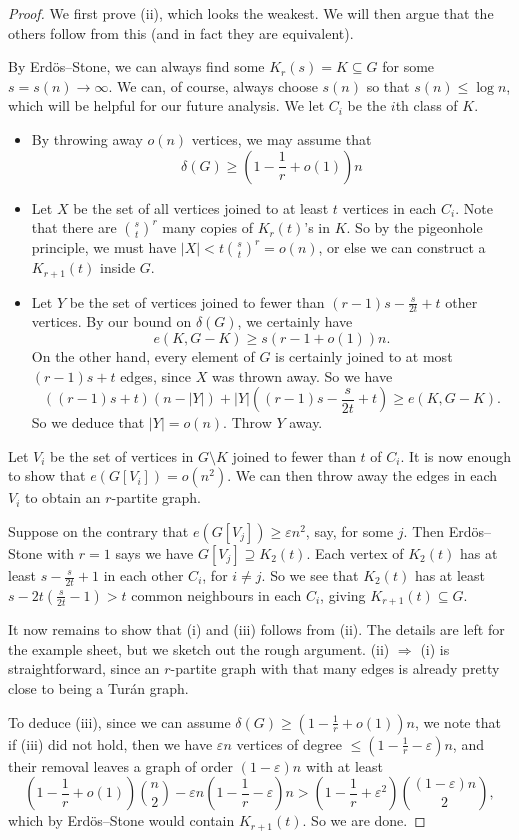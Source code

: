 \documentclass[a4paper]{article}
\begin{document}
\begin{proof}
  We first prove (ii), which looks the weakest. We will then argue that the others follow from this (and in fact they are equivalent).

  By Erd\"os--Stone, we can always find some $K_r(s) = K \subseteq G$ for some $s = s(n) \to \infty$. We can, of course, always choose $s(n)$ so that $s(n) \leq \log n$, which will be helpful for our future analysis. We let $C_i$ be the $i$th class of $K$.

  \begin{itemize}
    \item By throwing away $o(n)$ vertices, we may assume that
      \[
        \delta(G) \geq \left(1 - \frac{1}{r} + o(1)\right) n
      \]
    \item Let $X$ be the set of all vertices joined to at least $t$ vertices in each $C_i$. Note that there are $\binom{s}{t}^r$ many copies of $K_r(t)$'s in $K$. So by the pigeonhole principle, we must have $|X| < t \binom{s}{t}^r = o(n)$, or else we can construct a $K_{r + 1}(t)$ inside $G$.
    \item Let $Y$ be the set of vertices joined to fewer than $(r - 1) s - \frac{s}{2t} + t$ other vertices. By our bound on $\delta(G)$, we certainly have
      \[
        e(K, G - K) \geq s(r - 1 + o(1))n.
      \]
      On the other hand, every element of $G$ is certainly joined to at most $(r-1)s + t$ edges, since $X$ was thrown away. So we have
      \[
        ((r - 1)s + t)(n - |Y|) + |Y| \left((r - 1) s - \frac{s}{2t} + t\right) \geq e(K, G - K).
      \]
      So we deduce that $|Y| = o(n)$. Throw $Y$ away.
  \end{itemize}
  Let $V_i$ be the set of vertices in $G \setminus K$ joined to fewer than $t$ of $C_i$. It is now enough to show that $e(G[V_i]) = o(n^2)$. We can then throw away the edges in each $V_i$ to obtain an $r$-partite graph.

  Suppose on the contrary that $e(G[V_j]) \geq \varepsilon n^2$, say, for some $j$. Then Erd\"os--Stone with $r = 1$ says we have $G[V_j] \supseteq K_2(t)$. Each vertex of $K_2(t)$ has at least $s - \frac{s}{2t} + 1$ in each other $C_i$, for $i \not= j$. So we see that $K_2(t)$ has at least $s - 2t \left(\frac{s}{2t} - 1\right) > t$ common neighbours in each $C_i$, giving $K_{r + 1}(t) \subseteq G$.

  It now remains to show that (i) and (iii) follows from (ii). The details are left for the example sheet, but we sketch out the rough argument. (ii) $\Rightarrow$ (i) is straightforward, since an $r$-partite graph with that many edges is already pretty close to being a Tur\'an graph.

  To deduce (iii), since we can assume $\delta(G) \geq \left(1 - \frac{1}{r} + o(1)\right) n$, we note that if (iii) did not hold, then we have $\varepsilon n$ vertices of degree $\leq \left(1 - \frac{1}{r} - \varepsilon\right)n$, and their removal leaves a graph of order $(1 - \varepsilon) n$ with at least
  \[
    \left(1 - \frac{1}{r} + o(1)\right)\binom{n}{2} - \varepsilon n \left(1 - \frac{1}{r} - \varepsilon\right)n > \left(1 - \frac{1}{r} + \varepsilon^2\right) \binom{(1 - \varepsilon)n}{2},
  \]
  which by Erd\"os--Stone would contain $K_{r + 1}(t)$. So we are done.
\end{proof}
\end{document}
